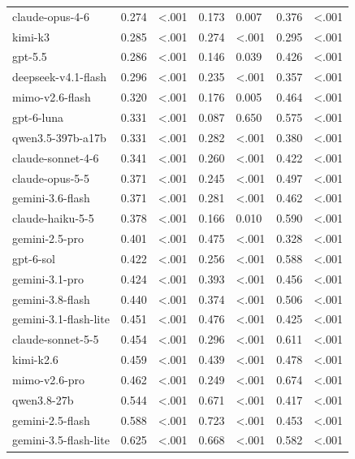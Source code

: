 \begin{table}
\begin{tabular}{lrlrlrl}
claude-opus-4-6 & 0.274 & <.001 & 0.173 & 0.007 & 0.376 & <.001 \\
kimi-k3 & 0.285 & <.001 & 0.274 & <.001 & 0.295 & <.001 \\
gpt-5.5 & 0.286 & <.001 & 0.146 & 0.039 & 0.426 & <.001 \\
deepseek-v4.1-flash & 0.296 & <.001 & 0.235 & <.001 & 0.357 & <.001 \\
mimo-v2.6-flash & 0.320 & <.001 & 0.176 & 0.005 & 0.464 & <.001 \\
gpt-6-luna & 0.331 & <.001 & 0.087 & 0.650 & 0.575 & <.001 \\
qwen3.5-397b-a17b & 0.331 & <.001 & 0.282 & <.001 & 0.380 & <.001 \\
claude-sonnet-4-6 & 0.341 & <.001 & 0.260 & <.001 & 0.422 & <.001 \\
claude-opus-5-5 & 0.371 & <.001 & 0.245 & <.001 & 0.497 & <.001 \\
gemini-3.6-flash & 0.371 & <.001 & 0.281 & <.001 & 0.462 & <.001 \\
claude-haiku-5-5 & 0.378 & <.001 & 0.166 & 0.010 & 0.590 & <.001 \\
gemini-2.5-pro & 0.401 & <.001 & 0.475 & <.001 & 0.328 & <.001 \\
gpt-6-sol & 0.422 & <.001 & 0.256 & <.001 & 0.588 & <.001 \\
gemini-3.1-pro & 0.424 & <.001 & 0.393 & <.001 & 0.456 & <.001 \\
gemini-3.8-flash & 0.440 & <.001 & 0.374 & <.001 & 0.506 & <.001 \\
gemini-3.1-flash-lite & 0.451 & <.001 & 0.476 & <.001 & 0.425 & <.001 \\
claude-sonnet-5-5 & 0.454 & <.001 & 0.296 & <.001 & 0.611 & <.001 \\
kimi-k2.6 & 0.459 & <.001 & 0.439 & <.001 & 0.478 & <.001 \\
mimo-v2.6-pro & 0.462 & <.001 & 0.249 & <.001 & 0.674 & <.001 \\
qwen3.8-27b & 0.544 & <.001 & 0.671 & <.001 & 0.417 & <.001 \\
gemini-2.5-flash & 0.588 & <.001 & 0.723 & <.001 & 0.453 & <.001 \\
gemini-3.5-flash-lite & 0.625 & <.001 & 0.668 & <.001 & 0.582 & <.001 \\
\bottomrule
\end{tabular}
\end{table}
